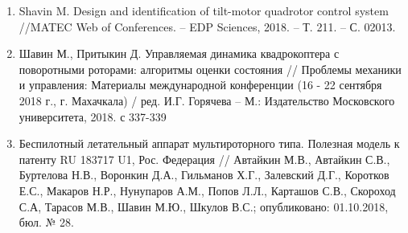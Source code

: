 \begin{enumerate}
	\item Shavin M. Design and identification of tilt-motor quadrotor control system //MATEC Web of Conferences. – EDP Sciences, 2018. – Т. 211. – С. 02013.
	
	\item Шавин М., Притыкин Д. Управляемая динамика квадрокоптера с поворотными роторами: алгоритмы оценки состояния // Проблемы механики и управления: Материалы международной конференции (16 - 22 сентября 2018 г., г. Махачкала) / ред. И.Г. Горячева – М.: Издательство Московского университета, 2018. с 337-339
	
	\item Беспилотный летательный аппарат мультироторного типа. Полезная модель к патенту RU 183717 U1, Рос. Федерация //
	Автайкин М.В., Автайкин С.В., Буртелова Н.В.,
	Воронкин Д.А., Гильманов Х.Г., Залевский Д.Г.,
	Коротков Е.С., Макаров Н.Р., Нунупаров А.М.,
	Попов Л.Л., Карташов С.В., Скороход С.А,
	Тарасов М.В., Шавин М.Ю., Шкулов В.С.; опубликовано: 01.10.2018, бюл. № 28.

\end{enumerate}
